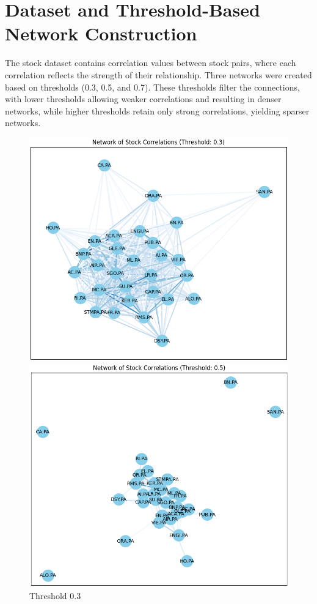 \documentclass[12pt]{article}
\begin{document}
\section{Dataset and Threshold-Based Network Construction}
The stock dataset contains correlation values between stock pairs, where each correlation reflects the strength of their relationship. Three networks were created based on thresholds (0.3, 0.5, and 0.7). These thresholds filter the connections, with lower thresholds allowing weaker correlations and resulting in denser networks, while higher thresholds retain only strong correlations, yielding sparser networks.
\begin{figure}[h!]
  \centering
  \begin{minipage}[b]{0.32\textwidth}
      \includegraphics[width=\textwidth]{2D_network_stock_corr3.png}
      \caption{Threshold 0.3}
      \label{fig:threshold03}
  \end{minipage}
  \hfill
  \begin{minipage}[b]{0.32\textwidth}
      \includegraphics[width=\textwidth]{2D_network_stock_corr5.png}

\end{minipage}
\end{figure}
\end{document}
